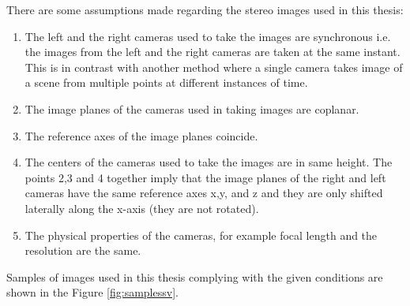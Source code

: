 There are some assumptions made regarding the stereo images used in this thesis:
\begin{enumerate}
    \item The left and the right cameras used to take the images are synchronous i.e. the images from the left and the right cameras are taken at the same instant. This is in contrast with another method where a single camera takes image of a scene from multiple points at different instances of time.
    \item The image planes of the cameras used in taking images are coplanar.
    \item The reference axes of the image planes coincide.
    \item The centers of the cameras used to take the images are  in same height. The points 2,3 and 4 together imply that the image planes of the right and left cameras have the same reference axes x,y, and z and they are only shifted laterally along the x-axis (they are not rotated).
    \item The physical properties of the cameras, for example focal length and the resolution are the same.
\end{enumerate}

Samples of images used in this thesis complying with the given conditions are shown in the Figure \ref{fig:samplessv}.

